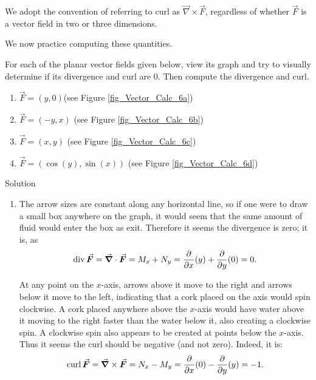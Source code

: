 We adopt the convention of referring to curl as $\vec{\nabla} \times \vec F$, regardless of whether $\vec F$ is a vector field in two or three dimensions. 

We now practice computing these quantities.

\begin{example}\label{ex_vectorfield1}
For each of the planar vector fields given below, view its graph and try to visually determine if its divergence and curl are 0. Then compute the divergence and curl.

\begin{multicols}{2}
\begin{enumerate}
	\item $\vec F = \left( y,0\right)$\quad  (see Figure \ref{fig_Vector_Calc_6a})
	\item $\vec F = \left( -y,x\right)$ \quad  (see Figure \ref{fig_Vector_Calc_6b})
	\item $\vec F = \left( x,y\right)$ \quad  (see Figure \ref{fig_Vector_Calc_6c})
	\item $\vec F = \left( \cos(y), \sin(x)\right)$ \quad  (see Figure \ref{fig_Vector_Calc_6d})
\end{enumerate}
\end{multicols}




Solution 


\begin{enumerate}
	\item The arrow sizes are constant along any horizontal line, so if one were to draw a small box anywhere on the graph, it would seem that the same amount of fluid would enter the box as exit. Therefore it seems the divergence is zero; it is, as 
	$$\divv\vec F = \vec{\nabla} \cdot \vec F = M_x + N_y = \frac{\partial}{\partial x}(y) + \frac{\partial}{\partial y}(0) = 0.$$

	At any point on the $x$-axis, arrows above it move to the right and arrows below it move to the left, indicating that a cork placed on the axis would spin clockwise. A cork placed anywhere above the $x$-axis would have water above it moving to the right faster than the water below it, also creating a clockwise spin. A clockwise spin also appears to be created at points below the $x$-axis. Thus it seems the curl should be negative (and not zero). Indeed, it is:
	$$\curl \vec F = \vec{\nabla}\times\vec F = N_x-M_y = \frac{\partial}{\partial x}(0) - \frac{\partial}{\partial y}(y) = -1.$$
	

\end{enumerate}
\end{example}
